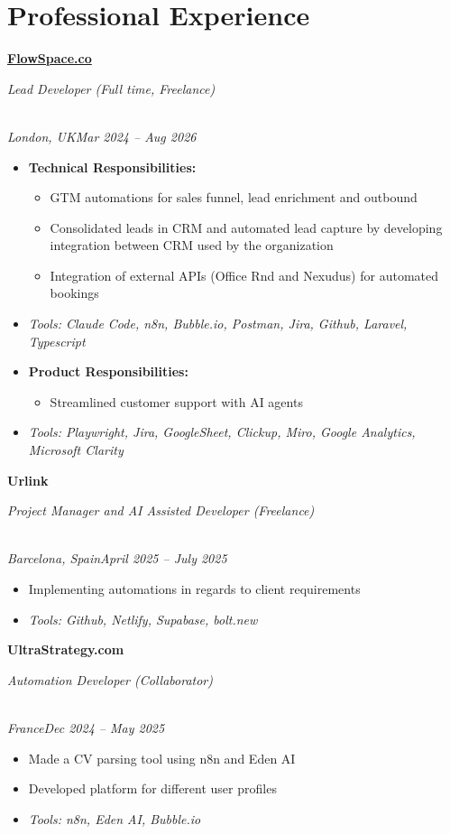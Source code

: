 \documentclass[a4paper,10pt]{article}
\newcommand{\role}[4]{\vspace{3pt}\noindent\hspace{0.6em}\parbox[t]{0.38\textwidth}{\raggedright\textbf{#1}}\hfill\parbox[t]{0.58\textwidth}{\raggedleft\textit{#2}}\\{\textit{#3}\hfill\textit{#4}}\vspace{1pt}}
\begin{document}
\section{Professional Experience}
\role{\href{https://flowspace.co}{FlowSpace.co}}{Lead Developer (Full time, Freelance)}{London, UK}{Mar 2024 -- Aug 2026}
\begin{itemize}
\item \textbf{Technical Responsibilities:}
\begin{itemize}[label=--]
\item GTM automations for sales funnel, lead enrichment and outbound
\item Consolidated leads in CRM and automated lead capture by developing integration between CRM used by the organization
\item Integration of external APIs (Office Rnd and Nexudus) for automated bookings
\end{itemize}
\item \textit{Tools: Claude Code, n8n, Bubble.io, Postman, Jira, Github, Laravel, Typescript}
\item \textbf{Product Responsibilities:}
\begin{itemize}[label=--]
\item Streamlined customer support with AI agents
\end{itemize}
\item \textit{Tools: Playwright, Jira, GoogleSheet, Clickup, Miro, Google Analytics, Microsoft Clarity}
\end{itemize}

\role{Urlink}{Project Manager and AI Assisted Developer (Freelance)}{Barcelona, Spain}{April 2025 -- July 2025}
\begin{itemize}
\item Implementing automations in regards to client requirements
\item \textit{Tools: Github, Netlify, Supabase, bolt.new}
\end{itemize}

\role{UltraStrategy.com}{Automation Developer (Collaborator)}{France}{Dec 2024 -- May 2025}
\begin{itemize}
\item Made a CV parsing tool using n8n and Eden AI
\item Developed platform for different user profiles
\item \textit{Tools: n8n, Eden AI, Bubble.io}
\end{itemize}
\end{document}
